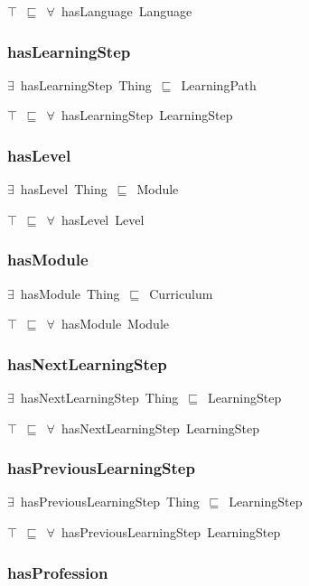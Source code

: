 \documentclass{article}
\begin{document}
\ensuremath{\top}~\ensuremath{\sqsubseteq}~\ensuremath{\forall}~hasLanguage~Language

\subsubsection*{hasLearningStep}

\ensuremath{\exists}~hasLearningStep~Thing~\ensuremath{\sqsubseteq}~LearningPath

\ensuremath{\top}~\ensuremath{\sqsubseteq}~\ensuremath{\forall}~hasLearningStep~LearningStep

\subsubsection*{hasLevel}

\ensuremath{\exists}~hasLevel~Thing~\ensuremath{\sqsubseteq}~Module

\ensuremath{\top}~\ensuremath{\sqsubseteq}~\ensuremath{\forall}~hasLevel~Level

\subsubsection*{hasModule}

\ensuremath{\exists}~hasModule~Thing~\ensuremath{\sqsubseteq}~Curriculum

\ensuremath{\top}~\ensuremath{\sqsubseteq}~\ensuremath{\forall}~hasModule~Module

\subsubsection*{hasNextLearningStep}

\ensuremath{\exists}~hasNextLearningStep~Thing~\ensuremath{\sqsubseteq}~LearningStep

\ensuremath{\top}~\ensuremath{\sqsubseteq}~\ensuremath{\forall}~hasNextLearningStep~LearningStep

\subsubsection*{hasPreviousLearningStep}

\ensuremath{\exists}~hasPreviousLearningStep~Thing~\ensuremath{\sqsubseteq}~LearningStep

\ensuremath{\top}~\ensuremath{\sqsubseteq}~\ensuremath{\forall}~hasPreviousLearningStep~LearningStep

\subsubsection*{hasProfession}
\end{document}
